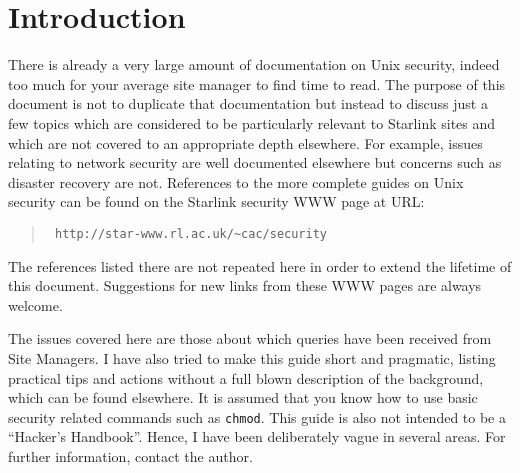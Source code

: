 \documentclass[11pt]{article}
\newcommand{\stardocinitials}  {SSN}
\newcommand{\stardocnumber}    {37.1}
\newcommand{\stardocname}{\stardocinitials /\stardocnumber}
\newcommand{\htmladdnormallink}[2]{#1}
\newenvironment{latexonly}{}{}
\newcommand{\xlabel}[1]{}
\renewcommand{\thepage}{\roman{page}}
\begin{document}
\begin{latexonly}
   \setlength{\parskip}{0mm}
   \tableofcontents
   \setlength{\parskip}{\medskipamount}
   \markright{\stardocname}
\end{latexonly}
\newpage
\renewcommand{\thepage}{\arabic{page}}

\section{\label{introduction}\xlabel{introduction}Introduction} 

There is already a very large amount of documentation on Unix security,
indeed too much for your average site manager to find time to read. The
purpose of this document is not to duplicate that documentation but
instead to discuss just a few topics which are considered to be
particularly relevant to Starlink sites and which are not covered to an
appropriate depth elsewhere. For example, issues relating to network
security are well documented elsewhere but concerns such as disaster
recovery are not. References to the more complete guides on Unix
security can be found on the Starlink security WWW page at URL:

\begin{quote}{\tt
\htmladdnormallink{http://star-www.rl.ac.uk/\~{}cac/security}
{http://star-www.rl.ac.uk/\~{}cac/security}}
\end{quote}

The references listed there are not repeated here in order to extend the
lifetime of this document. Suggestions for new links from these WWW pages
are always welcome.

The issues covered here are those about which queries have been
received from Site Managers. I have also tried to make this guide short
and pragmatic, listing practical tips and actions without a full blown
description of the background, which can be found elsewhere. It is
assumed that you know how to use basic security related commands such
as {\tt chmod}. This guide is also not intended to be a ``Hacker's
Handbook''. Hence, I have been deliberately vague in several
areas. For further information, contact the author.
\end{document}
